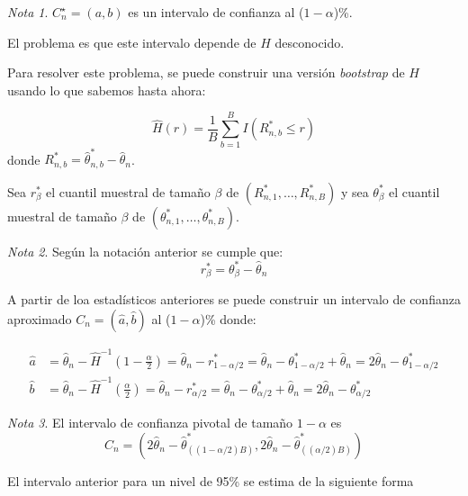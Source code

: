 \documentclass[
  12pt,
]{book}
\theoremstyle{definition}
\theoremstyle{definition}
\theoremstyle{definition}
\theoremstyle{definition}
\theoremstyle{remark}
\newtheorem*{remark}{Nota}
\begin{document}
\begin{remark}
\(C_{n}^{\star}=(a, b)\) es un intervalo de confianza al (\(1-\alpha\))\%.

El problema es que este intervalo depende de \(H\) desconocido.
\end{remark}

Para resolver este problema, se puede construir una versión \emph{bootstrap} de \(H\) usando lo que sabemos hasta ahora:

\[
\widehat{H}(r)=\frac{1}{B} \sum_{b=1}^{B} I\left(R_{n, b}^{*} \leq r\right)
\]
donde \(R_{n, b}^{*}=\widehat{\theta}_{n, b}^{*}-\widehat{\theta}_{n}\).

Sea \(r_{\beta}^{*}\) el cuantil muestral de tamaño \(\beta\) de \(\left(R_{n, 1}^{*}, \ldots, R_{n, B}^{*}\right)\) y sea \(\theta_{\beta}^{*}\) el cuantil muestral de tamaño \(\beta\) de \(\left(\theta_{n, 1}^{*}, \ldots, \theta_{n, B}^{*}\right)\).

\begin{remark}
Según la notación anterior se cumple que:
\begin{equation*}
r_{\beta}^{*}= \theta_{\beta}^{*}-\widehat{\theta}_{n}
\end{equation*}
\end{remark}

A partir de loa estadísticos anteriores se puede construir un intervalo de confianza aproximado \(C_{n}=(\widehat{a}, \widehat{b})\) al (\(1-\alpha\))\% donde:

\begin{align*}
\widehat{a}&= \widehat{\theta}_{n}-\widehat{H}^{-1}\left(1-\frac{\alpha}{2}\right) = \widehat{\theta}_{n}-r_{1-\alpha / 2}^{*} = \widehat{\theta}_{n}-\theta_{1-\alpha / 2}^{*} + \widehat{\theta}_{n} =2 \widehat{\theta}_{n}-\theta_{1-\alpha / 2}^{*} \\
\widehat{b} &=\widehat{\theta}_{n}-\widehat{H}^{-1}\left(\frac{\alpha}{2}\right)
=\widehat{\theta}_{n}-r_{\alpha / 2}^{*}
= \widehat{\theta}_{n}-\theta_{\alpha / 2}^{*} + \widehat{\theta}_{n}
=2 \widehat{\theta}_{n}-\theta_{\alpha / 2}^{*}
\end{align*}

\begin{remark}
El intervalo de confianza pivotal de tamaño \(1-\alpha\) es
\[
  C_{n}=\left(2 \widehat{\theta}_{n}-\widehat{\theta}_{((1-\alpha / 2) B)}^{*}, 2 \widehat{\theta}_{n}-\widehat{\theta}_{((\alpha / 2) B)}^{*}\right)
  \]
\end{remark}

El intervalo anterior para un nivel de 95\% se estima de la siguiente forma
\end{document}

